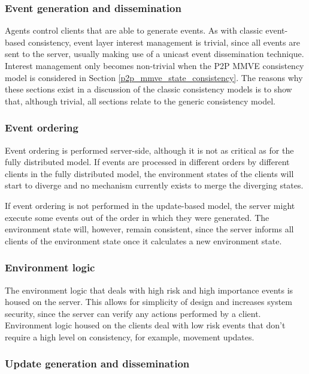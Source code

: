\subsubsection{Event generation and dissemination}
Agents control clients that are able to generate events. As with classic event-based consistency, event layer interest management is trivial, since all events are sent to the server, usually making use of a unicast event dissemination technique. Interest management only becomes non-trivial when the P2P MMVE consistency model is considered in Section \ref{p2p_mmve_state_consistency}. The reasons why these sections exist in a discussion of the classic consistency models is to show that, although trivial, all sections relate to the generic consistency model.

\subsubsection{Event ordering}
\label{cs_event_ordering}

Event ordering is performed server-side, although it is not as critical as for the fully distributed model. If events are processed in different orders by different clients in the fully distributed model, the environment states of the clients will start to diverge and no mechanism currently exists to merge the diverging states.

If event ordering is not performed in the update-based model, the server might execute some events out of the order in which they were generated. The environment state will, however, remain consistent, since the server informs all clients of the environment state once it calculates a new environment state.

\subsubsection{Environment logic}
The environment logic that deals with high risk and high importance events is housed on the server. This allows for simplicity of design and increases system security, since the server can verify any actions performed by a client. Environment logic housed on the clients deal with low risk events that don't require a high level on consistency, for example, movement updates.

\subsubsection{Update generation and dissemination}

